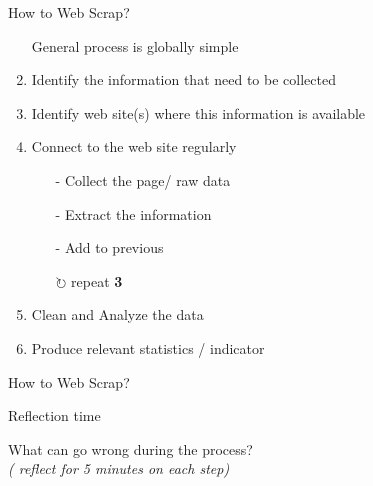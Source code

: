 \documentclass[xcolor=x11names, aspectratio=169, compress]{beamer}
\renewcommand{\(}{\begin{columns}}
\renewcommand{\)}{\end{columns}}
\newcommand{\<}[1]{\begin{column}{#1}}
\renewcommand{\>}{\end{column}}
\begin{document}
\begin{frame}{How to  Web Scrap?}
\pause
\begin{enumerate}[<+->]
    \item[] General process is globally simple
    \item Identify the information that need to be collected
    \item Identify web site(s) where this information is available
    \item Connect to the web site regularly
    \begin{itemize}[<+->]
         \item[-] Collect the page/ raw data
         \item[-] Extract the information
         \item[-] Add to previous
        \item[$\circlearrowright$] repeat \textbf{3}
    \end{itemize}
    \item Clean and Analyze the data
    \item Produce relevant statistics / indicator
\end{enumerate}
\end{frame}

{

\begin{frame}{How to  Web Scrap?}
\begin{center}
\Huge{Reflection time}

\vspace{1cm}
  \large{What can go wrong during the process?}\\
\vspace{1cm}
\emph{( reflect for  5 minutes on each step)}

\vspace{1cm}

\end{center}
\end{frame}
}  %

\end{document}
